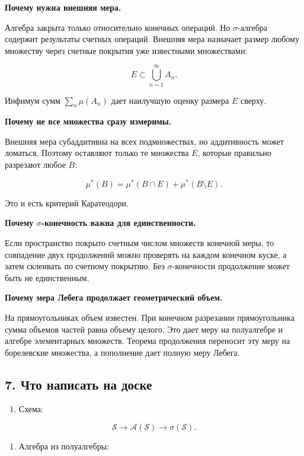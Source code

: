 \documentclass[
  11pt,
  a4paper,
]{article}
\providecommand{\tightlist}{%
  \setlength{\itemsep}{0pt}\setlength{\parskip}{0pt}}
\begin{document}
\textbf{Почему нужна внешняя мера.}

Алгебра закрыта только относительно конечных операций. Но
\(\sigma\)-алгебра содержит результаты счетных операций. Внешняя мера
назначает размер любому множеству через счетные покрытия уже известными
множествами:

\[
E\subset\bigcup_{n=1}^{\infty}A_n.
\]

Инфимум сумм \(\sum_n\mu(A_n)\) дает наилучшую оценку размера \(E\)
сверху.

\textbf{Почему не все множества сразу измеримы.}

Внешняя мера субаддитивна на всех подмножествах, но аддитивность может
ломаться. Поэтому оставляют только те множества \(E\), которые правильно
разрезают любое \(B\):

\[
\mu^*(B)=\mu^*(B\cap E)+\mu^*(B\setminus E).
\]

Это и есть критерий Каратеодори.

\textbf{Почему \(\sigma\)-конечность важна для единственности.}

Если пространство покрыто счетным числом множеств конечной меры, то
совпадение двух продолжений можно проверять на каждом конечном куске, а
затем склеивать по счетному покрытию. Без \(\sigma\)-конечности
продолжение может быть не единственным.

\textbf{Почему мера Лебега продолжает геометрический объем.}

На прямоугольниках объем известен. При конечном разрезании
прямоугольника сумма объемов частей равна объему целого. Это дает меру
на полуалгебре и алгебре элементарных множеств. Теорема продолжения
переносит эту меру на борелевские множества, а пополнение дает полную
меру Лебега.

\subsection{7. Что написать на
доске}\label{ux447ux442ux43e-ux43dux430ux43fux438ux441ux430ux442ux44c-ux43dux430-ux434ux43eux441ux43aux435}

\begin{enumerate}
\def\labelenumi{\arabic{enumi}.}
\tightlist
\item
  Схема:
\end{enumerate}

\[
\mathcal S\to\mathcal A(\mathcal S)\to\sigma(\mathcal S).
\]

\begin{enumerate}
\def\labelenumi{\arabic{enumi}.}
\setcounter{enumi}{1}
\tightlist
\item
  Алгебра из полуалгебры:
\end{enumerate}
\end{document}
